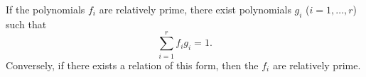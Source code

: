 If the polynomials $f_i$ are relatively prime, there exist polynomials $g_i$ ($i = 1, \ldots, r$) such that
$$\sum_{i=1}^{r} f_i g_i = 1.$$
Conversely, if there exists a relation of this form, then the $f_i$ are relatively prime.
